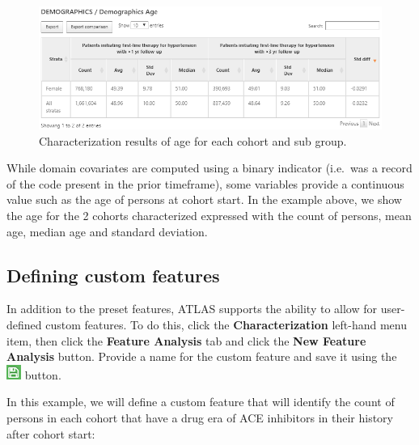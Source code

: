 \documentclass[11pt]{book}
\theoremstyle{definition}
\theoremstyle{definition}
\theoremstyle{definition}
\theoremstyle{remark}
\begin{document}
\begin{figure}

{\centering \includegraphics[width=1\linewidth]{images/Characterization/atlasCharacterizationResultsContinuous} 

}

\caption{Characterization results of age for each cohort and sub group.}\label{fig:atlasCharacterizationResultsContinuous}
\end{figure}

While domain covariates are computed using a binary indicator (i.e.~was a record of the code present in the prior timeframe), some variables provide a continuous value such as the age of persons at cohort start. In the example above, we show the age for the 2 cohorts characterized expressed with the count of persons, mean age, median age and standard deviation.

\hypertarget{defining-custom-features}{%
\subsection{Defining custom features}\label{defining-custom-features}}

In addition to the preset features, ATLAS supports the ability to allow for user-defined custom features. To do this, click the \textbf{Characterization} left-hand menu item, then click the \textbf{Feature Analysis} tab and click the \textbf{New Feature Analysis} button. Provide a name for the custom feature and save it using the \includegraphics{images/PopulationLevelEstimation/save.png} button. 

In this example, we will define a custom feature that will identify the count of persons in each cohort that have a drug era of ACE inhibitors in their history after cohort start:
\end{document}
